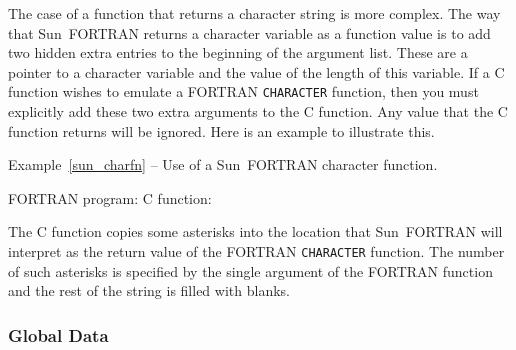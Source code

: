 \documentclass[twoside,11pt]{article}
\newcommand{\latex}[1]{#1}
\renewcommand{\_}{\texttt{\symbol{95}}}
\newcounter{examples}
\begin{document}
The case of a function that returns a character string is more complex. The way
that Sun~FORTRAN returns a character variable as a function value is to add two
hidden extra entries to the beginning of the argument list. These are a pointer
to a character variable and the value of the length of this variable. If a C
function wishes to emulate a FORTRAN \texttt{CHARACTER} function, then you must
explicitly add these two extra arguments to the C function. Any value that the
C function returns will be ignored. Here is an example to illustrate this.

\label{sun_charfn}
\begin{center}
Example\latex{~\ref{sun_charfn}}
-- Use of a Sun~FORTRAN character function.
\end{center}
\nopagebreak[4]
FORTRAN program:
\pagebreak[1]
C function:

The C function copies some asterisks into the location that Sun~FORTRAN will
interpret as the return value of the FORTRAN \texttt{CHARACTER} function. 
The number of
such asterisks is specified by the single argument of the FORTRAN function and
the rest of the string is filled with blanks.

\subsubsection{Global Data}
\end{document}
